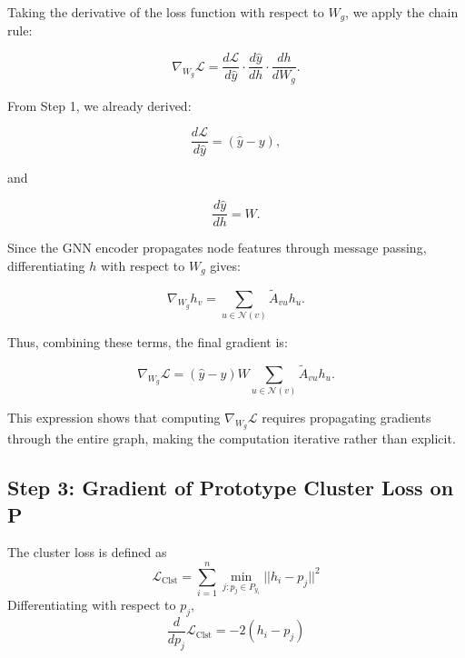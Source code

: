 \documentclass[12pt]{article}
\begin{document}
Taking the derivative of the loss function with respect to $W_g$, we apply the chain rule:

\begin{equation*}
    \nabla_{W_g} \mathcal{L} = \frac{d\mathcal{L}}{d\hat{y}} \cdot \frac{d\hat{y}}{dh} \cdot \frac{dh}{dW_g}.
\end{equation*}

From Step 1, we already derived:

\begin{equation*}
    \frac{d\mathcal{L}}{d\hat{y}} = (\hat{y} - y),
\end{equation*}

and

\begin{equation*}
    \frac{d\hat{y}}{dh} = W.
\end{equation*}

Since the GNN encoder propagates node features through message passing, differentiating $h$ with respect to $W_g$ gives:

\begin{equation*}
    \nabla_{W_g} h_v = \sum_{u \in \mathcal{N}(v)} \tilde{A}_{vu} h_u.
\end{equation*}

Thus, combining these terms, the final gradient is:

\begin{equation*}
    \nabla_{W_g} \mathcal{L} = (\hat{y} - y) W \sum_{u \in \mathcal{N}(v)} \tilde{A}_{vu} h_u.
\end{equation*}

This expression shows that computing $\nabla_{W_g} \mathcal{L}$ requires propagating gradients through the entire graph, making the computation iterative rather than explicit.



\subsection*{Step 3: Gradient of Prototype Cluster Loss on P}
The cluster loss is defined as
\begin{equation*}
    \mathcal{L}_{\text{Clst}} = \sum_{i=1}^{n} \min_{j:p_j \in P_{y_i}} ||h_i - p_j||^2
\end{equation*}
Differentiating with respect to $p_j$,
\begin{equation*}
    \frac{d}{dp_j} \mathcal{L}_{\text{Clst}} = -2(h_i - p_j)
\end{equation*}
\end{document}
